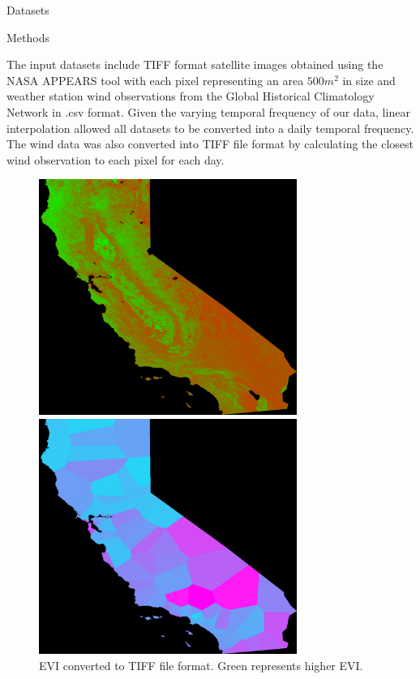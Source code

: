 \documentclass[final]{beamer}
\newlength{\colwidth}
\begin{document}
\begin{frame}[t]
\begin{columns}[t]
\begin{column}{\colwidth}
\begin{alertblock}{Datasets}
  \end{alertblock}

  \begin{block}{Methods}

     The input datasets include TIFF format satellite images obtained using the NASA APPEARS tool with each pixel representing an area $ 500m^2 $ in size and weather station wind observations from the Global Historical Climatology Network in .csv format. Given the varying temporal frequency of our data, linear interpolation allowed all datasets to be converted into a daily temporal frequency. The wind data was also converted into TIFF file format by calculating the closest wind observation to each pixel for each day. 

    
    \begin{figure}
    \centering
    \begin{minipage}{0.5\textwidth}
        \centering
        \includegraphics[width=0.75\textwidth]{images/2DCAEVI.png}
        \caption{EVI converted to TIFF file format. Green represents higher EVI.}
        \label{fig:CAEVI.png}
    \end{minipage}%
    \begin{minipage}{0.5\textwidth}
        \centering
        \includegraphics[width=0.75\textwidth]{images/2DCAwind.png}

\end{minipage}
\end{figure}
\end{block}
\end{column}
\end{columns}
\end{frame}
\end{document}
